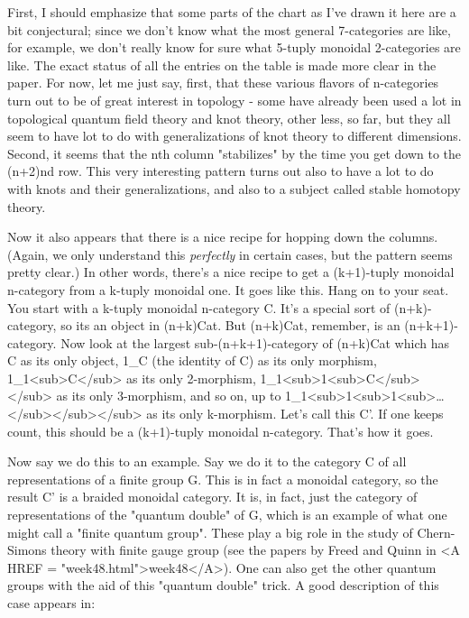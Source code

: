 First, I should emphasize that some parts of the chart as I've
drawn it here are a bit conjectural; since we don't know what
the most general 7-categories are like, for example, we don't
really know for sure what 5-tuply monoidal 2-categories are like.
The exact status of all the entries on the table is made more
clear in the paper.  For now, let me just say, first, that these
various flavors of n-categories turn out to be of great interest
in topology - some have already been used a lot in topological
quantum field theory and knot theory, other less, so far, but they
all seem to have lot to do with generalizations of knot theory to
different dimensions.  Second, it seems that the nth column "stabilizes"
by the time you get down to the (n+2)nd row.  This very interesting
pattern turns out also to have a lot to do with knots and their
generalizations, and also to a subject called stable homotopy theory.

Now it also appears that there is a nice recipe for hopping down the 
columns.   (Again, we only understand this \emph{perfectly} in certain
cases, but the pattern seems pretty clear.)  In other words, there's
a nice recipe to get a (k+1)-tuply monoidal n-category from a
k-tuply monoidal one.  It goes like this.  Hang on to your seat.
You start with a k-tuply monoidal n-category C.  It's a special
sort of (n+k)-category, so its an object in (n+k)Cat.  But
(n+k)Cat, remember, is an (n+k+1)-category.  Now look at the
largest sub-(n+k+1)-category of (n+k)Cat which has C as its
only object, 1_{C} (the identity of C) as its only morphism,
1_{1<sub>C}</sub> 
as its only 2-morphism, 1_{1<sub>1<sub>C}</sub></sub> 
as its only 3-morphism,
and so on, up to 1_{1<sub>1<sub>1<sub>\ldots }</sub></sub></sub>
as its only k-morphism.  Let's call
this C'.  If one keeps count, this should be a (k+1)-tuply monoidal 
n-category.   That's how it goes. 

Now say we do this to an example.  Say we do it to the category C
of all representations of a finite group G.  This is in fact a monoidal
category, so the result C' is a braided monoidal category.  It is,
in fact, just the category of representations of the "quantum double"
of G, which is an example of what one might call a "finite quantum
group".  These play a big role in the study of Chern-Simons theory
with finite gauge group (see the papers by Freed and Quinn in <A HREF = "week48.html">week48</A>).  
One can also get the other quantum groups with the aid of this
"quantum double" trick.  A good description of this case appears
in:

